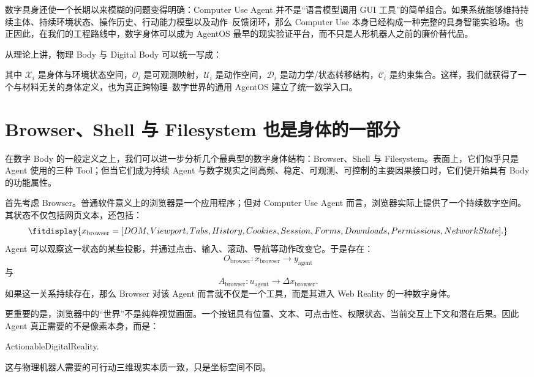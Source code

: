 数字具身还使一个长期以来模糊的问题变得明确：Computer Use Agent 并不是“语言模型调用 GUI 工具”的简单组合。如果系统能够维持持续主体、持续环境状态、操作历史、行动能力模型以及动作--反馈闭环，那么 Computer Use 本身已经构成一种完整的具身智能实验场。也正因此，在我们的工程路线中，数字身体可以成为 AgentOS 最早的现实验证平台，而不只是人形机器人之前的廉价替代品。

从理论上讲，物理 Body 与 Digital Body 可以统一写成：
\begin{statementbox}
\centering
{}
\end{statementbox}
其中 $\mathcal X_i$ 是身体与环境状态空间，$\mathcal O_i$ 是可观测映射，$\mathcal U_i$ 是动作空间，$\mathcal D_i$ 是动力学/状态转移结构，$\mathcal C_i$ 是约束集合。这样，我们就获得了一个与材料无关的身体定义，也为真正跨物理--数字世界的通用 AgentOS 建立了统一数学入口。

\section{Browser、Shell 与 Filesystem 也是身体的一部分}

在数字 Body 的一般定义之上，我们可以进一步分析几个最典型的数字身体结构：Browser、Shell 与 Filesystem。表面上，它们似乎只是 Agent 使用的三种 Tool；但当它们成为持续 Agent 与数字现实之间高频、稳定、可观测、可控制的主要因果接口时，它们便开始具有 Body 的功能属性。

首先考虑 Browser。普通软件意义上的浏览器是一个应用程序；但对 Computer Use Agent 而言，浏览器实际上提供了一个持续数字空间。其状态不仅包括网页文本，还包括：
\[
\fitdisplay{
x_{\mathrm{browser}}
=
[
DOM,
Viewport,
Tabs,
History,
Cookies,
Session,
Forms,
Downloads,
Permissions,
NetworkState
].
}
\]
Agent 可以观察这一状态的某些投影，并通过点击、输入、滚动、导航等动作改变它。于是存在：
\[
O_{\mathrm{browser}}
:
x_{\mathrm{browser}}
\rightarrow
y_{\mathrm{agent}}
\]
与
\[
A_{\mathrm{browser}}
:
u_{\mathrm{agent}}
\rightarrow
\Delta x_{\mathrm{browser}}.
\]
如果这一关系持续存在，那么 Browser 对该 Agent 而言就不仅是一个工具，而是其进入 Web Reality 的一种数字身体。

更重要的是，浏览器中的“世界”不是纯粹视觉画面。一个按钮具有位置、文本、可点击性、权限状态、当前交互上下文和潜在后果。因此 Agent 真正需要的不是像素本身，而是：
\begin{statementbox}
ActionableDigitalReality.
\end{statementbox}
这与物理机器人需要的可行动三维现实本质一致，只是坐标空间不同。

